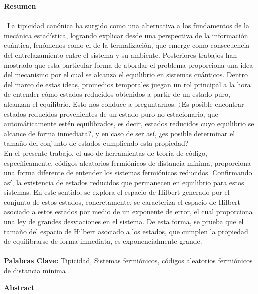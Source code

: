 

\textbf{\LARGE Resumen}\\\\
\
La tipicidad canónica ha surgido como una alternativa a los fundamentos de la mecánica estadística, logrando explicar desde una perspectiva de la información cuántica, fenómenos como el de la termalización, que emerge como consecuencia del entrelazamiento entre el sistema y su ambiente.  Posteriores trabajos han mostrado que esta particular forma de abordar el problema proporciona una idea del mecanismo por el cual se alcanza el equilibrio en sistemas cuánticos. Dentro del marco de estas ideas, promedios temporales juegan un rol principal a la hora de entender cómo estados reducidos obtenidos a partir de un estado puro, alcanzan el equilibrio. Esto nos conduce a preguntarnos: ¿Es posible encontrar estados reducidos provenientes de un estado puro no estacionario, que automáticamente estén equilibrados, es decir, estados reducidos cuyo equilibrio se alcance de forma inmediata?, y en caso de ser así, ¿es posible determinar el tamaño del conjunto de estados cumpliendo esta propiedad?\\
\indent En el presente trabajo, el uso de herramientas de teoría de código, específicamente, códigos aleatorios fermiónicos de distancia mínima, proporciona una forma diferente de entender los sistemas fermiónicos reducidos. Confirmando así, la  existencia de estados reducidos que permanecen en equilibrio para estos sistemas. En este sentido, se explora el espacio de Hilbert generado por el conjunto de estos estados, concretamente, se caracteriza el espacio de Hilbert asociado a estos estados por medio de un exponente de error, el cual proporciona una ley de grandes desviaciones en el sistema. De esta forma, se prueba que el tamaño del espacio de Hilbert asociado a los estados, que cumplen la propiedad de equilibrarse de forma inmediata, es exponencialmente grande.\\\\
\textbf{\small Palabras Clave:} Tipicidad, Sistemas fermiónicos, códigos aleatorios fermiónicos de distancia mínima .
\newpage{}
\textbf{\LARGE Abstract}\\\\
\
